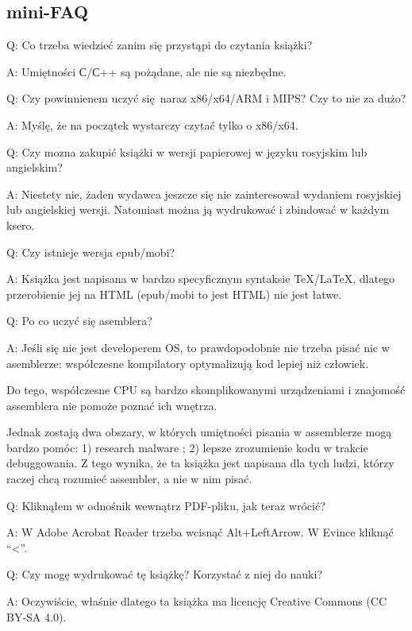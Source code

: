 \subsection*{mini-FAQ}

\par Q: Co trzeba wiedzieć zanim się przystąpi do czytania książki?
\par A: Umiętności С/С++ są pożądane, ale nie są niezbędne.

\par Q: Czy powinnienem uczyć się naraz x86/x64/ARM i MIPS? Czy to nie za dużo?
\par A: Myślę, że na początek wystarczy czytać tylko o x86/x64.

\par Q: Czy mozna zakupić książki w wersji papierowej w języku rosyjskim lub angielskim?
\par A: Niestety nie, żaden wydawca jeszcze się nie zainteresował wydaniem rosyjskiej lub angielskiej wersji. Natomiast można ją wydrukować i zbindować w każdym ksero.

\par Q: Czy istnieje wersja epub/mobi?
\par A: Książka jest napisana w bardzo specyficznym syntaksie TeX/LaTeX, dlatego przerobienie jej na HTML (epub/mobi to jest HTML)
nie jest łatwe.

\par Q: Po co uczyć się asemblera?
\par A: Jeśli się nie jest developerem \ac{OS}, to prawdopodobnie nie trzeba pisać nic w asemblerze: współczesne kompilatory optymalizują kod lepiej niż człowiek.

Do tego, współczesne \ac{CPU} są bardzo skomplikowanymi urządzeniami i znajomość assemblera nie pomoże poznać ich wnętrza.

Jednak zostają dwa obszary, w których umiętności pisania w assemblerze mogą bardzo pomóc:
1) research malware ; 2) lepsze zrozumienie kodu w trakcie debuggowania.
Z tego wynika, że ta książka jest napisana dla tych ludzi, którzy raczej chcą rozumieć assembler, a nie w nim pisać.

\par Q: Kliknąłem w odnośnik wewnątrz PDF-pliku, jak teraz wrócić?
\par A: W Adobe Acrobat Reader trzeba wcisnąć Alt+LeftArrow. W Evince kliknąć ``<''.

\par Q: Czy mogę wydrukować tę książkę? Korzystać z niej do nauki?
\par A: Oczywiście, właśnie dlatego ta książka ma licencję Creative Commons (CC BY-SA 4.0).

